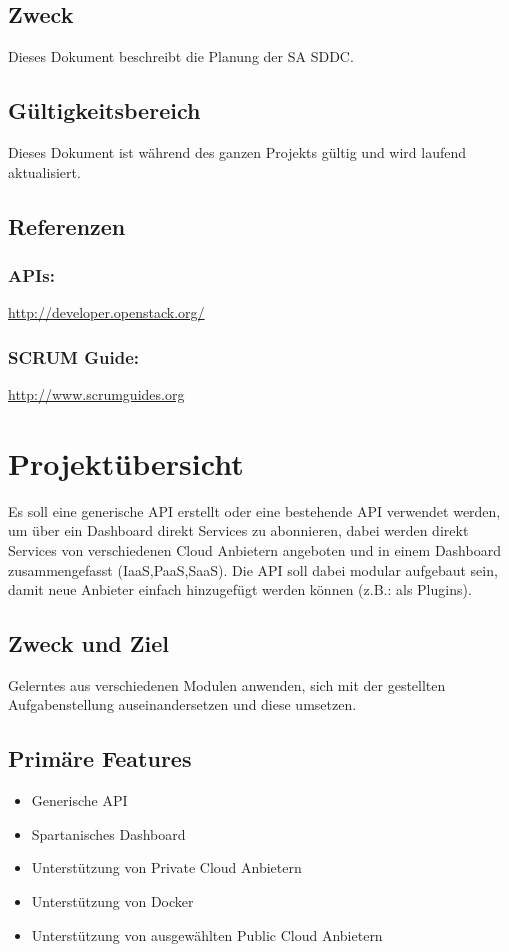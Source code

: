 \documentclass[11pt]{scrartcl}
\begin{document}
\subsection{Zweck}
Dieses Dokument beschreibt die Planung der SA SDDC.
\subsection{Gültigkeitsbereich}
Dieses Dokument ist während des ganzen Projekts gültig und wird laufend aktualisiert.

\subsection{Referenzen}
\subsubsection{APIs:} \href{http://developer.openstack.org/}{http://developer.openstack.org/}
\subsubsection{SCRUM Guide:} \href{http://www.scrumguides.org/docs/scrumguide/v1/Scrum-Guide-DE.pdf}{http://www.scrumguides.org}
\section{Projektübersicht}
Es soll eine generische API erstellt oder eine bestehende API verwendet werden, um über ein 
Dashboard direkt Services zu abonnieren, dabei werden direkt Services von 
verschiedenen Cloud Anbietern angeboten und in einem Dashboard zusammengefasst 
(IaaS,PaaS,SaaS).
Die API soll dabei modular aufgebaut sein, damit neue Anbieter einfach 
hinzugefügt werden können (z.B.: als Plugins).
\subsection{Zweck und Ziel}
 Gelerntes aus verschiedenen Modulen anwenden, sich mit der gestellten Aufgabenstellung auseinandersetzen 
 und diese umsetzen.

\subsection{Primäre Features}
\begin{itemize}
  \item Generische API
  \item Spartanisches Dashboard
  \item Unterstützung von Private Cloud Anbietern
  \item Unterstützung von Docker
  \item Unterstützung von ausgewählten Public Cloud Anbietern
\end{itemize}
\end{document}
